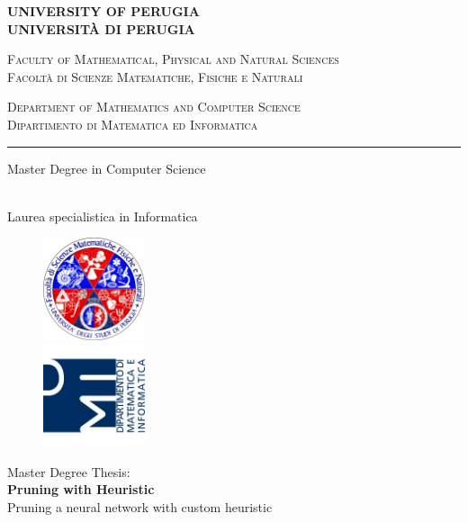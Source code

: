 \begin{titlepage}
    \begin{center}
        \textbf{\Large UNIVERSITY OF PERUGIA}\\
        \textbf{UNIVERSITÀ DI PERUGIA}
        \vspace{0.5cm}

        \scshape{Faculty of Mathematical, Physical and Natural Sciences}\\
        \scshape{Facoltà di Scienze Matematiche, Fisiche e Naturali}
        \vspace{0.5cm}

        \scshape{Department of Mathematics and Computer Science}\\
        \scshape{Dipartimento di Matematica ed Informatica}

        \rule[1mm]{\textwidth}{0.2mm}
        \vspace{0.5cm}

        \begin{Large}Master Degree in Computer Science\end{Large}\\
        Laurea specialistica in Informatica
        \vspace{0.5cm}

        \begin{figure}[htbp]
            \begin{center}
                
                \includegraphics[width=3cm]{images/ssmmffnn_logo.jpg}\\
                \includegraphics[width=3cm]{images/dmi_logo.png}
            \end{center}
        \end{figure}

        Master Degree Thesis:\\
        \vspace{0.5cm}
        \textbf{\LARGE Pruning with Heuristic}\\
        \vspace{0.3cm}
        Pruning a neural network with custom heuristic\\
        \vspace{1.5cm}


\end{center}
\end{titlepage}
